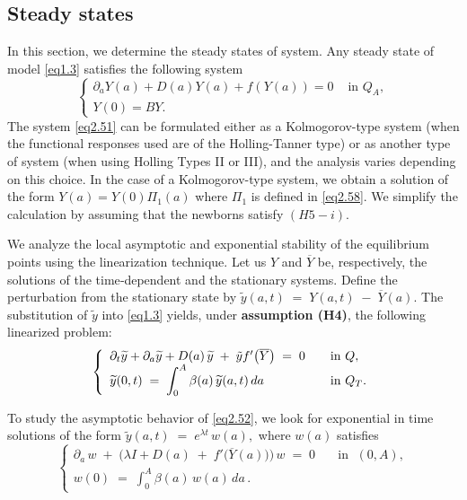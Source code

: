 \documentclass[10pt, a4paper]{amsart}
\newcounter{assu}
\theoremstyle{plain}
\theoremstyle{definition}
\theoremstyle{remark}
\numberwithin{equation}{section}
\begin{document}
\subsection{Steady states}\label{s2.4}
In this section, we determine the steady states of system. Any steady state of model \eqref{eq1.3} satisfies the
following system 
\begin{equation}\label{eq2.51}
\left\lbrace 
\begin{array}{ll}
\partial_aY(a)+D(a)Y(a)+f(Y(a))=0 &\text{ in }Q_A,\\  
Y(0)=BY.
\end{array}
\right.
\end{equation} 
The system \eqref{eq2.51} can be formulated either as a Kolmogorov-type system (when the functional responses used are of the Holling-Tanner type) or as another type of system (when using Holling Types II or III), and the analysis varies depending on this choice.  In the case of a Kolmogorov-type system, we obtain a solution of the form \( Y(a) = Y(0)\Pi_1(a) \) where $\Pi_1$ is defined in \eqref{eq2.58}. We simplify the calculation by assuming that the newborns satisfy $(H5-i)$.  

We analyze the local asymptotic and exponential stability of the equilibrium points using the linearization technique. Let us $Y$ and $\overline{Y}$ be, respectively, the solutions of the time‐dependent and the stationary systems.  Define the perturbation from the stationary state by $
\widetilde{y}(a,t) \;=\; Y(a,t)\;-\;\overline{Y}(a).$ The substitution of $\widetilde{y}$ into \eqref{eq1.3} yields, under {\bf assumption (H4)}, the following linearized problem:
\begin{equation}\label{eq2.52}
\left\lbrace 
\begin{array}{ll}
\partial_t\widetilde{y}+\partial_a\widetilde{y}+D(a)\,\widetilde{y}
\;+\;\Tilde{y}f'\bigl(\overline{Y}\bigr)
\;=\;0 
\quad&\text{in }Q,\\
\widetilde{y}(0,t) 
\;=\;\displaystyle\int_{0}^{A}\beta(a)\,\widetilde{y}(a,t)\,da\,\quad&\text{in }Q_T. 
\end{array}
\right.
\end{equation}  

To study the asymptotic behavior of \eqref{eq2.52}, we look for exponential in time solutions of the form $
\widetilde{y}(a,t) \;=\; e^{\lambda t}\,w(a),
$ where $w(a)$ satisfies
\begin{equation}\label{eq2.53}
\left\lbrace 
\begin{array}{ll}
\partial_a\,w \;+\;\bigl(\lambda I + D(a)\;+\;f'\bigl(\overline{Y}(a)\bigr)\bigr)\,w\;=\;0 
\quad&\text{in }\;(0,A),\\
w(0) 
\;=\;\displaystyle\int_{0}^{A}\beta(a)\,w(a)\,da\,.
\end{array}
\right.
\end{equation}
\end{document}
